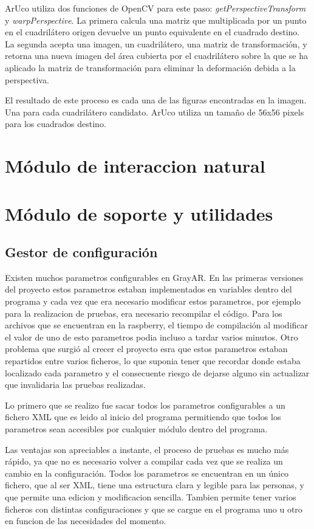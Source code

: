 ArUco utiliza dos funciones de OpenCV para este paso: \textit{getPerspectiveTransform} y \textit{warpPerspective}. La primera calcula una matriz que multiplicada por un punto en el cuadrilátero origen devuelve un punto equivalente en el cuadrado destino. La segunda acepta una imagen, un cuadrilátero, una matriz de transformación, y retorna una nueva imagen del área cubierta por el cuadrilátero sobre la que se ha aplicado la matriz de transformación para eliminar la deformación debida a la perspectiva. 

El resultado de este proceso es cada una de las figuras encontradas en la imagen. Una para cada cuadrilátero candidato. ArUco utiliza un tamaño de 56x56 pixels para los cuadrados destino.


\section{Módulo de interaccion natural}
\section{Módulo de soporte y utilidades}
\subsection{Gestor de configuración}
Existen muchos parametros configurables en GrayAR. En las primeras versiones del proyecto estos parametros estaban implementados en variables dentro del programa y cada vez que era necesario modificar estos parametros, por ejemplo para la realizacion de pruebas, era necesario recompilar el código. Para los archivos que se encuentran en la raspberry, el tiempo de compilación al modificar el valor de uno de esto parametros podia incluso a tardar varios minutos. Otro problema que surgió al crecer el proyecto esra que estos parametros estaban repartidos entre varios ficheros, lo que suponia tener que recordar donde estaba localizado cada parametro y el consecuente riesgo de dejarse alguno sin actualizar que invalidaria las pruebas realizadas.

Lo primero que se realizo fue sacar todos los parametros configurables a un fichero XML que es leido al inicio del programa permitiendo que todos los parametros sean accesibles por cualquier módulo dentro del programa.

Las ventajas son apreciables a instante, el proceso de pruebas es mucho más rápido, ya que no es necesario volver a compilar cada vez que se realiza un cambio en la configuración. Todos los parametros se encuentran en un único fichero, que al ser XML, tiene una estructura clara y legible para las personas, y que permite una edicion y modificacion sencilla. Tambien permite tener varios ficheros con distintas configuraciones y que se cargue en el programa uno u otro en funcion de las necesidades del momento.
 
